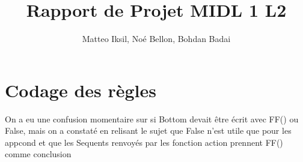 \documentclass{article}
\title{Rapport de Projet MIDL 1 L2}
\author{Matteo Iksil, Noé Bellon, Bohdan Badai}
\begin{document}
\maketitle

\section{Codage des règles}
On a eu une confusion momentaire sur si Bottom devait être écrit avec FF() ou False, mais on a constaté en relisant le sujet que False n'est utile que pour les appcond et que les Sequents renvoyés par les fonction action prennent FF() comme conclusion
\end{document}
